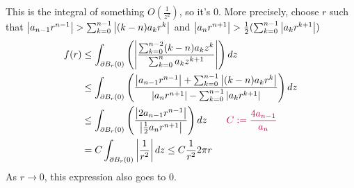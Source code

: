 \documentclass{homework}
\begin{document}
\begin{solution}
                                                                                                                                                                                                                        This is the integral of something $O(\frac{1}{z^2})$, so it's 0. More precisely, choose $r$ such that $\left|a_{n-1}r^{n-1}\right| > \sum_{k=0}^{n-1} \left|(k-n)a_kr^{k}\right|$ and $\left|a_nr^{n+1}\right| > \frac{1}{2}(\sum_{k=0}^{n-1} \left|a_kr^{k+1}\right|)$
                                                                                                                                                                                                                        \begin{align*}
                                                                                                                                                                                                                            f(r) &\leq \int_{\partial B_r(0)} \left( \left|\frac{\sum_{k=0}^{n-2} (k-n)a_kz^{k} }{\sum_{k=0}^n a_kz^{k+1}}\right|\right) dz\\
                                                                                                                                                                                                                                &\leq \int_{\partial B_r(0)} \left( \frac{\left|a_{n-1}r^{n-1}\right|+\sum_{k=0}^{n-1} \left|(k-n)a_kr^{k}\right|}{\left|a_nr^{n+1}\right| - \sum_{k=0}^{n-1} \left|a_kr^{k+1}\right|}\right) dz \\
                                                                                                                                                                                                                                     &\leq \int_{\partial B_r(0)} \left( \frac{\left|2a_{n-1}r^{n-1}\right|}{\left|\frac{1}{2}a_nr^{n+1}\right|}\right) dz \qquad \color{purple}C:=\frac{4a_{n-1}}{a_n}\\
                                                                                                                                                                                                                                          &= C\int_{\partial B_r(0)} \left|\frac{1}{r^2}\right| dz \leq C\frac{1}{r^2}2\pi r
                                                                                                                                                                                                                                          \end{align*}
                                                                                                                                                                                                                                          As $r\to 0$, this expression also goes to 0.
                                                                                                                                                                                                                                          \end{solution}
\end{document}
